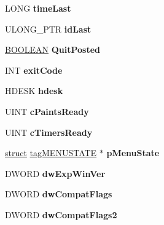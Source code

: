 \begin{DoxyCompactItemize}
L\+O\+NG {\bfseries time\+Last}
\item 
\mbox{\label{struct___t_h_r_e_a_d_i_n_f_o_a0e516f2ec95df714b666b21fa24f8d3d}} 
U\+L\+O\+N\+G\+\_\+\+P\+TR {\bfseries id\+Last}
\item 
\mbox{\label{struct___t_h_r_e_a_d_i_n_f_o_a8014aa3971a4cd9d56f8ae23142ff42e}} 
\hyperlink{_processor_bind_8h_a112e3146cb38b6ee95e64d85842e380a}{B\+O\+O\+L\+E\+AN} {\bfseries Quit\+Posted}
\item 
\mbox{\label{struct___t_h_r_e_a_d_i_n_f_o_a228474e7fcf365e82ee3035bb9e62b3f}} 
I\+NT {\bfseries exit\+Code}
\item 
\mbox{\label{struct___t_h_r_e_a_d_i_n_f_o_a759fe0ea3a58e85eed4ded1042e422a6}} 
H\+D\+E\+SK {\bfseries hdesk}
\item 
\mbox{\label{struct___t_h_r_e_a_d_i_n_f_o_ad3d8d6c7d5508dc4b786555c0a2911e3}} 
U\+I\+NT {\bfseries c\+Paints\+Ready}
\item 
\mbox{\label{struct___t_h_r_e_a_d_i_n_f_o_aa72084c37c3654de5b842d7e87795e70}} 
U\+I\+NT {\bfseries c\+Timers\+Ready}
\item 
\mbox{\label{struct___t_h_r_e_a_d_i_n_f_o_a0e303f8b102337d3cb6e5be4f49ad160}} 
\hyperlink{interfacestruct}{struct} \hyperlink{structtag_m_e_n_u_s_t_a_t_e}{tag\+M\+E\+N\+U\+S\+T\+A\+TE} $\ast$ {\bfseries p\+Menu\+State}
\item 
\mbox{\label{struct___t_h_r_e_a_d_i_n_f_o_a12e568071ebf912ae73f3cf208890553}} 
D\+W\+O\+RD {\bfseries dw\+Exp\+Win\+Ver}
\item 
\mbox{\label{struct___t_h_r_e_a_d_i_n_f_o_a7f9bff0854d38f8b33caa0fc41bc4d0e}} 
D\+W\+O\+RD {\bfseries dw\+Compat\+Flags}
\item 
\mbox{\label{struct___t_h_r_e_a_d_i_n_f_o_ac847ef9f61de522ba8065cdfddc0457c}} 
D\+W\+O\+RD {\bfseries dw\+Compat\+Flags2}

\end{DoxyCompactItemize}
